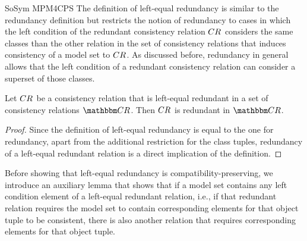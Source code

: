 \begin{copiedFrom}{SoSym MPM4CPS}
The definition of left-equal redundancy is similar to the redundancy definition but restricts the notion of redundancy to cases in which the left condition of the redundant consistency relation $CR_{}$ considers the same classes than the other relation in the set of consistency relations that induces consistency of a model set to $CR_{}$.
As discussed before, redundancy in general allows that the left condition of a redundant consistency relation can consider a superset of those classes. %

\begin{lemma} \label{lemma:leftequalredundancyimpliesredundancy}
    Let $CR_{}$ be a consistency relation that is left-equal redundant in a set of consistency relations $\consistencyrelationset{CR}$. Then $CR_{}$ is redundant in $\consistencyrelationset{CR}$.
\end{lemma}

\begin{proof}
    Since the definition of left-equal redundancy is equal to the one for redundancy, apart from the additional restriction for the class tuples, redundancy of a left-equal redundant relation is a direct implication of the definition.
\end{proof}


Before showing that left-equal redundancy is compatibility-preserving, we introduce an auxiliary lemma that shows that if a model set contains any left condition element of a left-equal redundant relation, i.e., if that redundant relation requires the model set to contain corresponding elements for that object tuple to be consistent, there is also another relation that requires corresponding elements for that object tuple.



\end{copiedFrom}
